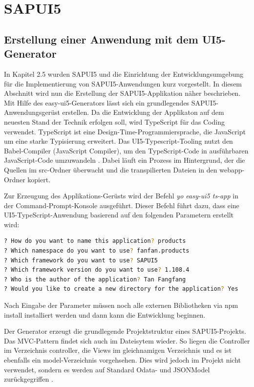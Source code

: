 \section{SAPUI5}
\subsection{Erstellung einer Anwendung mit dem UI5-Generator}
In Kapitel 2.5 wurden SAPUI5 und die Einrichtung der Entwicklungsumgebung für die Implementierung von SAPUI5-Anwendungen kurz vorgestellt. In diesem Abschnitt wird nun die Erstellung der SAPUI5-Applikation näher beschrieben.
Mit Hilfe des easy-ui5-Generators lässt sich ein grundlegendes SAPUI5-Anwendungsgerüst erstellen. Da die Entwicklung der Applikaton auf dem neuesten Stand der Technik erfolgen soll, wird TypeScript für das Coding verwendet. TypeScript ist eine Design-Time-Programmiersprache, die JavaScript um eine starke Typisierung erweitert. Das UI5-Typescript-Tooling nutzt den Babel-Compiler (JavaScript Compiler), um den TypeScript-Code in ausführbaren JavaScript-Code umzuwandeln \cite{pm:gswt}. Dabei läuft ein Prozess im Hintergrund, der die Quellen im src-Ordner überwacht und die transpilierten Dateien in den webapp-Ordner kopiert. 

Zur Erzeugung des Applikations-Gerüsts wird der Befehl \textit{yo easy-ui5 ts-app} in der Command-Prompt-Konsole ausgeführt. Dieser Befehl führt dazu, dass eine UI5-TypeScript-Anwendung basierend auf den folgenden Parametern erstellt wird:

\begin{lstlisting}[language=bash]
? How do you want to name this application? products
? Which namespace do you want to use? fanfan.products 
? Which framework do you want to use? SAPUI5 
? Which framework version do you want to use? 1.108.4 
? Who is the author of the application? Tan Fangfang 
? Would you like to create a new directory for the application? Yes
\end{lstlisting}

Nach Eingabe der Parameter müssen noch alle externen Bibliotheken via npm install installiert werden und dann kann die Entwicklung beginnen.

Der Generator erzeugt die grundlegende Projektstruktur eines SAPUI5-Projekts. Das MVC-Pattern findet sich auch im Dateisytem wieder. So liegen die Controller im Verzeichnis controller, die Views im gleichnamigen Verzeichnis und es ist ebenfalls ein model-Verzeichnis vorgehsehen. Dies wird jedoch im Projekt nicht verwendet, sondern es werden auf Standard Odata- und JSONModel zurückgegriffen \cite{sud:ao}.

